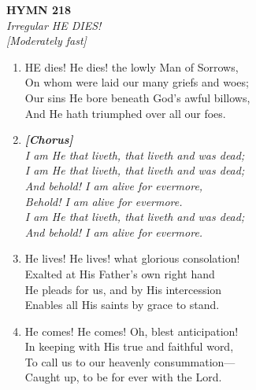 \newpage
\begin{center}
    {\Large \textbf{HYMN 218}}
    \\
    \textit{Irregular HE DIES!}
    \\
    \textit{\small [Moderately fast]}
\end{center}
\vspace{1em}

\begin{enumerate}
    \item HE dies! He dies! the lowly Man of Sorrows, \\
        On whom were laid our many griefs and woes; \\
        Our sins He bore beneath God's awful billows, \\
        And He hath triumphed over all our foes.

    \item[] \vspace{0.4em}
    \textbf{\textit{[Chorus]}} \\
    \textit{I am He that liveth, that liveth and was dead;} \\
    \textit{I am He that liveth, that liveth and was dead;} \\
    \textit{    And behold! I am alive for evermore,} \\
    \textit{    Behold! I am alive for evermore.} \\
    \textit{I am He that liveth, that liveth and was dead;} \\
    \textit{    And behold! I am alive for evermore.}
    \vspace{0.4em}

    \item He lives! He lives! what glorious consolation! \\
        Exalted at His Father's own right hand \\
        He pleads for us, and by His intercession \\
        Enables all His saints by grace to stand.

    \item He comes! He comes! Oh, blest anticipation! \\
        In keeping with His true and faithful word, \\
        To call us to our heavenly consummation--- \\
        Caught up, to be for ever with the Lord.

\end{enumerate}

